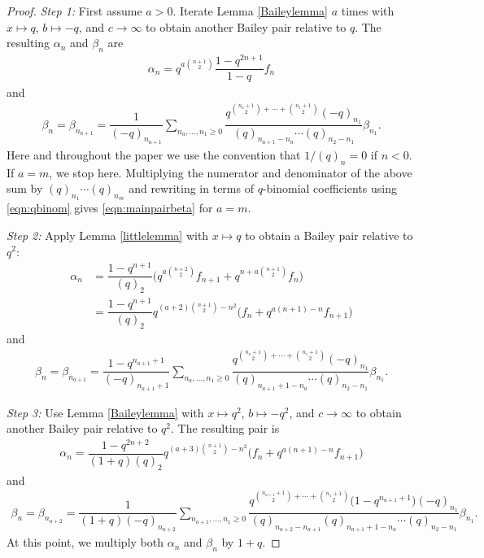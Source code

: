 \documentclass[pdftex]{sigma}
\numberwithin{equation}{section}
\begin{document}
\begin{proof}
	{\it Step 1\emph{:}} First assume $a > 0$. Iterate Lemma \ref{Baileylemma} $a$ times with $x\mapsto q$, $b\mapsto -q$, and $c\rightarrow \infty$ to obtain another Bailey pair relative to $q$. The resulting $\alpha_n$ and $\beta_n$ are
	\begin{align}
		\alpha_n=q^{a\binom{n+1}{2}}\dfrac{1-q^{2n+1}}{1-q}f_n
		\label{eqn:alphafn}
	\end{align}
	and
	\begin{align}
		\beta_n=\beta_{n_{a+1}}=
		\dfrac{1}{(-q)_{n_{a+1}}}\sum_{n_a,\dots,n_1\geq 0}
		\dfrac{q^{\binom{n_a+1}{2}+\cdots+\binom{n_1+1}{2}}(-q)_{n_1}}{(q)_{n_{a+1}-n_a}\cdots (q)_{n_2-n_1}}\beta_{n_1}. \label{eqn:betastep1}
	\end{align}
	Here and throughout the paper we use the convention that $1/(q)_n = 0$ if $n <0$.
	If $a=m$, we stop here. Multiplying the numerator and denominator of the above sum by $(q)_{n_1} \cdots (q)_{n_m}$ and rewriting in terms of $q$-binomial coefficients using \eqref{eqn:qbinom} gives \eqref{eqn:mainpairbeta} for $a=m$.
	
	{\it Step 2\emph{:}} Apply Lemma \ref{littlelemma} with $x \mapsto q$ to obtain a Bailey pair relative to $q^2$:
	\begin{align*}
		\alpha_n &{}= \dfrac{1-q^{n+1}}{(q)_2}\bigl(
		q^{a\binom{n+2}{2}}f_{n+1} + q^{n+a\binom{n+1}{2}}f_n\bigr)\\
		&{}=\dfrac{1-q^{n+1}}{(q)_2}q^{(a+2)\binom{n+1}{2}-n^2}
		\bigl(
		f_n+q^{a(n+1)-n}f_{n+1}\bigr)
	\end{align*}
	and
	\begin{align*}
		\beta_n=\beta_{n_{a+1}}=
		\dfrac{1-q^{n_{a+1}+1}}{(-q)_{n_{a+1}+1}}\sum_{n_a,\dots,n_1\geq 0}
		\dfrac{q^{\binom{n_a+1}{2}+\cdots+\binom{n_1+1}{2}}(-q)_{n_1}}{(q)_{n_{a+1}+1-n_a}\cdots (q)_{n_2-n_1}}\beta_{n_1}.
	\end{align*}
	
	
	{\it Step 3\emph{:}} Use Lemma \ref{Baileylemma} with $x\mapsto q^2$, $b\mapsto-q^2$, and $c \to \infty$ to obtain another Bailey pair relative to $q^2$. The resulting pair is
	\begin{align*}
		\alpha_n
		=\dfrac{1-q^{2n+2}}{(1+q)(q)_2}q^{(a+3)\binom{n+1}{2}-n^2}
		\bigl(
		f_n+q^{a(n+1)-n}f_{n+1}\bigr)
	\end{align*}
	and
	\begin{align*}
		\beta_n=\beta_{n_{a+2}}=
		\dfrac{1}{(1+q)(-q)_{n_{a+2}}}\sum_{n_{a+1},\dots,n_1\geq 0}
		\dfrac{q^{\binom{n_{a+1}+1}{2}+\cdots+\binom{n_1+1}{2}}\bigl(1-q^{n_{a+1}+1}\bigr)(-q)_{n_1}}{(q)_{n_{a+2}-n_{a+1}}(q)_{n_{a+1}+1-n_a}\cdots (q)_{n_2-n_1}}\beta_{n_1}.
	\end{align*}
	At this point, we multiply both
	$\alpha_n$ and $\beta_n$ by $1+q$.
	

\end{proof}
\end{document}
